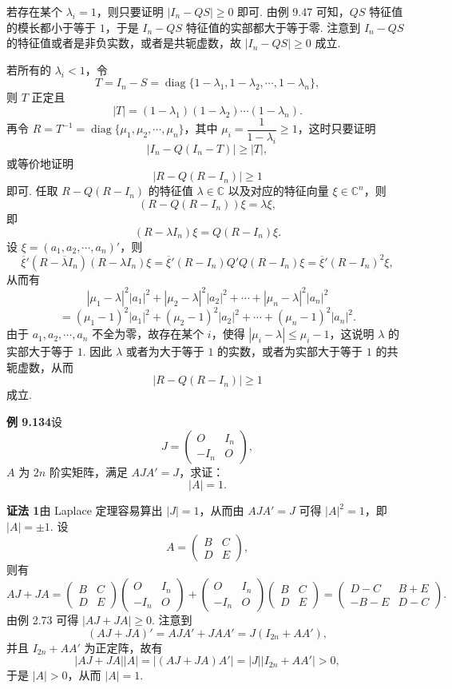 \documentclass[UTF8,12pt,a4paper,fontset=fandol]{ctexart}
\begin{document}
若存在某个 $\lambda_i=1$，则只要证明 $|I_n-QS|\ge0$ 即可. 由例 9.47 可知，$QS$ 特征值的模长都小于等于 $1$，于是 $I_n-QS$ 特征值的实部都大于等于零. 注意到 $I_n-QS$ 的特征值或者是非负实数，或者是共轭虚数，故 $|I_n-QS|\ge0$ 成立.

若所有的 $\lambda_i<1$，令
\[
T=I_n-S=\operatorname{diag}\{1-\lambda_1,1-\lambda_2,\cdots,1-\lambda_n\},
\]
则 $T$ 正定且
\[
|T|=(1-\lambda_1)(1-\lambda_2)\cdots(1-\lambda_n).
\]
再令 $R=T^{-1}=\operatorname{diag}\{\mu_1,\mu_2,\cdots,\mu_n\}$，其中 $\mu_i=\dfrac{1}{1-\lambda_i}\ge1$，这时只要证明
\[
|I_n-Q(I_n-T)|\ge |T|,
\]
或等价地证明
\[
|R-Q(R-I_n)|\ge1
\]
即可. 任取 $R-Q(R-I_n)$ 的特征值 $\lambda\in\mathbb{C}$ 以及对应的特征向量 $\xi\in\mathbb{C}^n$，则
\[
(R-Q(R-I_n))\xi=\lambda\xi,
\]
即
\[
(R-\lambda I_n)\xi=Q(R-I_n)\xi.
\]
设 $\xi=(a_1,a_2,\cdots,a_n)'$，则
\[
\overline{\xi}'(R-\overline{\lambda}I_n)(R-\lambda I_n)\xi
=\overline{\xi}'(R-I_n)Q'Q(R-I_n)\xi
=\overline{\xi}'(R-I_n)^2\xi,
\]
从而有
\[
|\mu_1-\lambda|^2|a_1|^2+|\mu_2-\lambda|^2|a_2|^2+\cdots+|\mu_n-\lambda|^2|a_n|^2
\]
\[
=(\mu_1-1)^2|a_1|^2+(\mu_2-1)^2|a_2|^2+\cdots+(\mu_n-1)^2|a_n|^2.
\]
由于 $a_1,a_2,\cdots,a_n$ 不全为零，故存在某个 $i$，使得 $|\mu_i-\lambda|\le\mu_i-1$，这说明 $\lambda$ 的实部大于等于 $1$. 因此 $\lambda$ 或者为大于等于 $1$ 的实数，或者为实部大于等于 $1$ 的共轭虚数，从而
\[
|R-Q(R-I_n)|\ge1
\]
成立.

\noindent\textbf{例 9.134}\quad 设
\[
J=\begin{pmatrix}
O&I_n\\
-I_n&O
\end{pmatrix},
\]
$A$ 为 $2n$ 阶实矩阵，满足 $AJA'=J$，求证：
\[
|A|=1.
\]

\noindent\textbf{证法 1}\quad 由 Laplace 定理容易算出 $|J|=1$，从而由 $AJA'=J$ 可得 $|A|^2=1$，即 $|A|=\pm1$. 设
\[
A=\begin{pmatrix}
B&C\\
D&E
\end{pmatrix},
\]
则有
\[
AJ+JA=\begin{pmatrix}
B&C\\
D&E
\end{pmatrix}
\begin{pmatrix}
O&I_n\\
-I_n&O
\end{pmatrix}
+
\begin{pmatrix}
O&I_n\\
-I_n&O
\end{pmatrix}
\begin{pmatrix}
B&C\\
D&E
\end{pmatrix}
=\begin{pmatrix}
D-C&B+E\\
-B-E&D-C
\end{pmatrix}.
\]
由例 2.73 可得 $|AJ+JA|\ge0$. 注意到
\[
(AJ+JA)'=AJA'+JA A'=J(I_{2n}+AA'),
\]
并且 $I_{2n}+AA'$ 为正定阵，故有
\[
|AJ+JA||A|=|(AJ+JA)A'|=|J||I_{2n}+AA'|>0,
\]
于是 $|A|>0$，从而 $|A|=1$.
\end{document}
